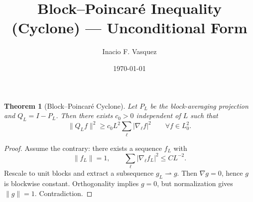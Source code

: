 \documentclass{article}
\newtheorem{theorem}{Theorem}
\begin{document}
\title{Block--Poincar\'e Inequality (Cyclone) --- Unconditional Form}
\author{Inacio F. Vasquez}
\date{\today}
\maketitle

\begin{theorem}[Block--Poincar\'e Cyclone]
Let \(P_L\) be the block-averaging projection and \(Q_L = I - P_L\).
Then there exists \(c_0>0\) independent of \(L\) such that
\[
\|Q_L f\|^2 \ge c_0 L^2 \sum_{\ell} |\nabla_\ell f|^2
\qquad \forall f \in L^2_0.
\]
\end{theorem}

\begin{proof}
Assume the contrary: there exists a sequence \(f_L\) with
\[
\|f_L\|=1,\qquad
\sum_{\ell}|\nabla_\ell f_L|^2 \le C L^{-2}.
\]
Rescale to unit blocks and extract a subsequence \(g_L \rightharpoonup g\).
Then \(\nabla g = 0\), hence \(g\) is blockwise constant.
Orthogonality implies \(g=0\), but normalization gives \(\|g\|=1\).
Contradiction.
\end{proof}
\end{document}
